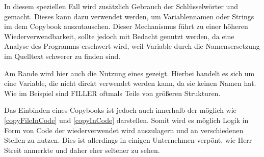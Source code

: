 In diesem speziellen Fall wird zusätzlich Gebrauch der Schlüsselwörter  und  gemacht. Dieses kann dazu verwendet werden, um Variablennamen oder Strings im dem Copybook auszutauschen. Dieser Mechanismus führt zu einer höheren Wiederverwendbarkeit, sollte jedoch mit Bedacht genutzt werden, da eine Analyse des Programms erschwert wird, weil Variable durch die Namensersetzung im Quelltext schwerer zu finden sind.

Am Rande wird hier auch die Nutzung eines  gezeigt. Hierbei handelt es sich um eine Variable, die nicht direkt verwendet werden kann, da sie keinen Namen hat. Wie im Beispiel sind FILLER oftmals Teile von größeren Strukturen.

Das Einbinden eines Copybooks ist jedoch auch innerhalb der  möglich wie \autoref{copyFileInCode} und \autoref{copyInCode} darstellen. Somit wird es möglich Logik in Form von Code der wiederverwendet wird auszulagern und an verschiedenen Stellen zu nutzen. Dies ist allerdings in einigen Unternehmen verpönt, wie Herr Streit anmerkte und daher eher seltener zu sehen.


